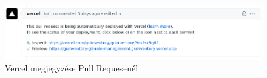 \begin{figure}[!ht]
  \centering
  \includegraphics[width=150mm, keepaspectratio]{figures/vercel.png}
  \caption{Vercel megjegyzése Pull Reques–nél}
  \label{fig:vercel}
\end{figure}


